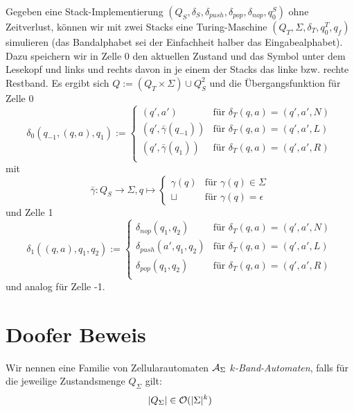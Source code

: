 \documentclass{article}
\begin{document}
\begin{beispiel}
    Gegeben eine Stack-Implementierung $(Q_S, \delta_S, \delta_{push}, \delta_{pop}, \delta_{nop}, q^S_0)$ ohne Zeitverlust, können wir mit zwei Stacks eine Turing-Maschine $(Q_T, \Sigma, \delta_T, q^T_0, q_f)$ simulieren (das Bandalphabet sei der Einfachheit halber das Eingabealphabet). Dazu speichern wir in Zelle 0  den aktuellen Zustand und das Symbol unter dem Lesekopf und links und rechts davon in je einem der Stacks das linke bzw. rechte Restband. Es ergibt sich $Q := (Q_T \times \Sigma) \cup Q^2_S$ und die Übergangsfunktion für Zelle 0
    \[ \delta_0(q_{-1}, (q, a), q_1) :=
    \begin{cases}
        (q', a') &\text{für } \delta_T(q, a) = (q', a', N) \\
        (q', \bar\gamma(q_{-1})) &\text{für } \delta_T(q, a) = (q', a', L) \\
        (q', \bar\gamma(q_1)) &\text{für } \delta_T(q, a) = (q', a', R) \\
    \end{cases} \]
mit
\[ \bar\gamma : Q_S \rightarrow \Sigma, q \mapsto \begin{cases}
        \gamma(q) &\text{für } \gamma(q) \in \Sigma \\
        \sqcup &\text{für } \gamma(q) = \epsilon
    \end{cases} \]
und Zelle 1
    \[ \delta_1((q, a), q_1, q_2) :=
    \begin{cases}
        \delta_{nop}(q_1, q_2) &\text{für } \delta_T(q, a) = (q', a', N) \\
        \delta_{push}(a', q_1, q_2) &\text{für } \delta_T(q, a) = (q', a', L) \\
        \delta_{pop}(q_1, q_2) &\text{für } \delta_T(q, a) = (q', a', R) \\
    \end{cases} \]
und analog für Zelle -1.
\end{beispiel}

\section{Doofer Beweis}

\begin{definition}
    Wir nennen eine Familie von Zellularautomaten $\mathcal{A}_\Sigma$ \emph{$k$-Band-Automaten}, falls für die jeweilige Zustandsmenge $Q_\Sigma$ gilt:
    \begin{equation}
        \lvert Q_\Sigma\rvert \in \mathcal{O}(\lvert\Sigma\rvert^k) \label{def:ntape}
    \end{equation}
\end{definition}
\end{document}
